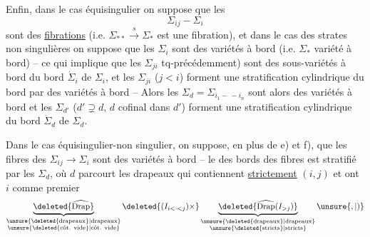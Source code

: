 Enfin, dans le cas équisingulier on suppose que les
\[
\Sigma_{ij}-\Sigma_i
\]
sont des \uline{fibrations} (i.e. $\Sigma_{**}\xrightarrow{s}\Sigma_*$ est une fibration), et dans le cas des strates non singulières on suppose que les $\Sigma_i$ sont des variétés à bord (i.e. $\Sigma_*$ variété à bord) -- ce qui implique que les $\Sigma_{ji}$  tq-précédemment) sont des sous-variétés à bord du  bord $\dot\Sigma_i$ de $\Sigma_i$, et les $\Sigma_{ji}$ ($j<i$) forment  une stratification cylindrique \margin{$*$}du \deleted{$\unsure{\Sigma_*}$} bord par des variétés à bord -- Alors les $\Sigma_d=\Sigma_{i_1-\, -i_n}$ sont alors des variétés à bord  et les $\Sigma_{d'}$ ($d'\supsetneq d$, $d$ cofinal dans $d'$)  forment une stratification cylindrique du bord  $\dot\Sigma_d$ de $\Sigma_d$.

Dans le cas équisingulier-non singulier, on suppose, en plus de e) et f), que les fibres des  $\Sigma_{ij}\longrightarrow\Sigma_i$ sont des variétés à bord -- le   des bords des fibres est  stratifié par les $\Sigma_d$, où $d$  parcourt les drapeaux qui contiennent \uline{strictement} \deleted{$\unsure{\Sigma}$} $(i,j)$ et ont $i$ comme premier
\[
\underbrace{\deleted{\widehat{\operatorname{Drap}}}}_{\substack{\text{\unsure{\deleted{drapeaux}|drapeaux}}\\\text{\unsure{\deleted{côt. vide}|côt. vide}}}}\deleted{(I_{i<\cdot<j})\times}
\underbrace{\deleted{\widehat{\operatorname{Drap}}(I_{>j})}}_{\substack{\text{\unsure{\deleted{drapeaux}|drapeaux}}\\\text{\unsure{\deleted{stricts}|stricts}}}}\unsure{,|)}
\]
